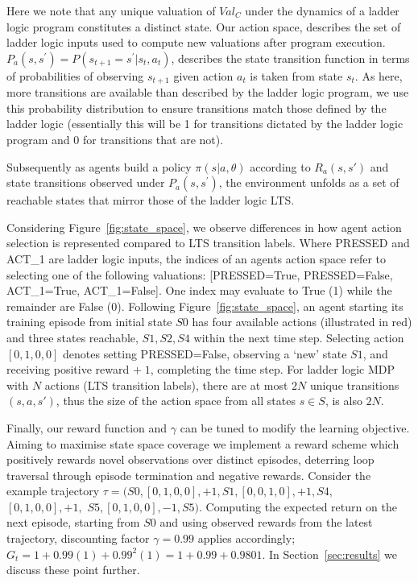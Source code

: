 \documentclass[runningheads]{llncs}
\begin{document}
Here we note that any unique valuation of $Val_C$ under the dynamics of a ladder logic program constitutes a distinct state. Our action space, describes the set of ladder logic inputs used to compute new valuations after program execution. $P_a(s,s^\prime) = P(s_{t+1} = s^\prime | s_t, a_t)$, describes the state transition function in terms of probabilities of observing $s_{t+1}$ given action $a_t$ is taken from state $s_t$. As here, more transitions are available than described by the ladder logic program, we use this probability distribution to ensure transitions match those defined by the ladder logic (essentially this will be 1 for transitions dictated by the ladder logic program and 0 for transitions that are not). 

Subsequently as agents build a policy $\pi(s|a,\theta)$ according to $R_a(s,s')$ and state transitions observed under $P_a(s,s^\prime)$, the environment unfolds as a set of reachable states that mirror those of the ladder logic LTS. 


Considering Figure~\ref{fig:state_space}, we observe differences in how agent action selection is represented compared to LTS transition labels. Where PRESSED and ACT\_1 are ladder logic inputs, the indices of an agents action space refer to selecting one of the following valuations: [PRESSED=True, PRESSED=False, ACT\_1=True, ACT\_1=False]. One index may evaluate to True (1) while the remainder are False (0). Following Figure~\ref{fig:state_space}, an agent starting its training episode from initial state $S0$ has four available actions (illustrated in red) and three states reachable, $S1,S2,S4$ within the next time step. Selecting action $[0,1,0,0]$ denotes setting PRESSED=False, observing a `new' state $S1$, and receiving positive reward $+\;1$, completing the time step. For ladder logic MDP with $N$ actions (LTS transition labels), there are at most $2N$ unique transitions $(s,a,s')$, thus the size of the action space from all states $s \in S$, is also $2N$. 

Finally, our reward function and $\gamma$ can be tuned to modify the learning objective. Aiming to maximise state space coverage we implement a reward scheme which positively rewards novel observations over distinct episodes, deterring loop traversal through episode termination and negative rewards. Consider the example trajectory $\tau =(S0, [0,1,0,0], + 1, S1, [0,0,1,0], + 1, S4,$ $[0,1,0,0], + 1,$ $S5, [0,1,0,0], -1, S5)$. Computing the expected return on the next episode, starting from $S0$ and using observed rewards from the latest trajectory, discounting factor $\gamma = 0.99$ applies accordingly; $G_t = 1 + 0.99(1) + 0.99^{2}(1) = 1 + 0.99 + 0.9801$.  In Section~\ref{sec:results} we discuss these point further.
\end{document}
